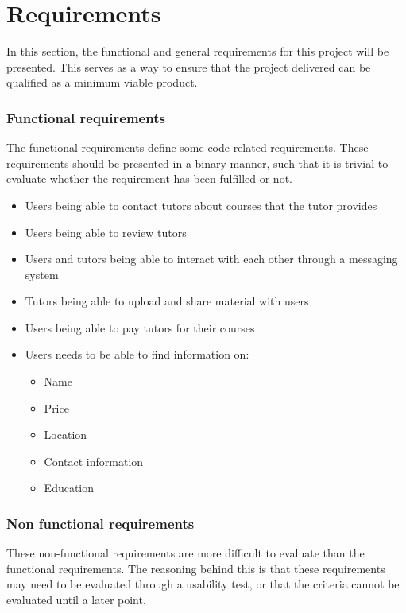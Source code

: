 \section{Requirements}
In this section, the functional and general requirements for this project will be presented.
This serves as a way to ensure that the project delivered can be qualified as a minimum viable product.

\subsubsection{Functional requirements}
The functional requirements define some code related requirements. These requirements should be presented in a binary manner, such that it is trivial to evaluate whether the requirement has been fulfilled or not.

\begin{itemize}
    \item Users being able to contact tutors about courses that the tutor provides
    \item Users being able to review tutors
    \item Users and tutors being able to interact with each other through a messaging system
    \item Tutors being able to upload and share material with users
    \item Users being able to pay tutors for their courses
    \item Users needs to be able to find information on:
    \begin{itemize}
        \item Name
        \item Price
        \item Location
        \item Contact information
        \item Education
    \end{itemize}
\end{itemize}

\subsubsection{Non functional requirements}
These non-functional requirements are more difficult to evaluate than the functional requirements.
The reasoning behind this is that these requirements may need to be evaluated through a usability test, or that the criteria cannot be evaluated until a later point. 


